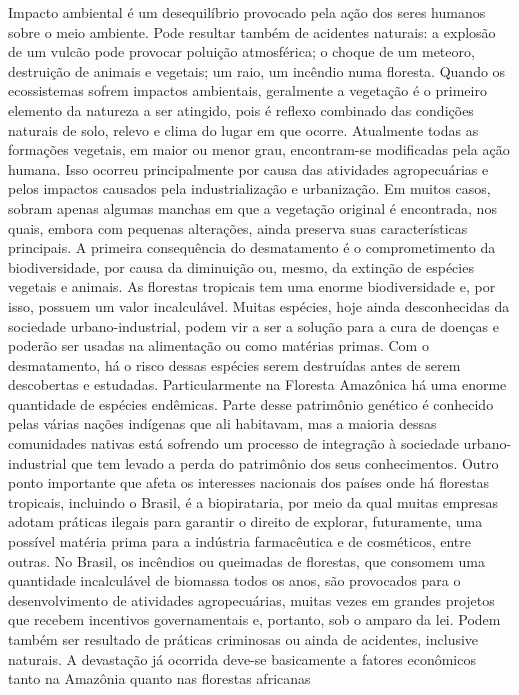Impacto ambiental é um desequilíbrio provocado pela ação dos seres humanos sobre o meio ambiente.
Pode resultar também de acidentes naturais: a explosão de um vulcão pode provocar poluição atmosférica; 
o choque de um meteoro, destruição de animais e vegetais; um raio, um incêndio numa floresta.
    Quando os ecossistemas sofrem impactos ambientais, geralmente a vegetação é o primeiro elemento da
natureza a ser atingido, pois é reflexo combinado das condições naturais de solo, relevo e clima do lugar 
em que ocorre.
    Atualmente todas as formações vegetais, em maior ou menor grau, encontram-se modificadas pela ação humana.
Isso ocorreu principalmente por causa das atividades agropecuárias e pelos impactos causados pela industrialização
e urbanização. Em muitos casos, sobram apenas algumas manchas em que a vegetação original é encontrada, nos quais,
embora com pequenas alterações, ainda preserva suas características principais.
    A primeira consequência do desmatamento é o comprometimento da biodiversidade, por causa da diminuição ou, mesmo,
da extinção de espécies vegetais e animais. As florestas tropicais tem uma enorme biodiversidade e, por isso, possuem
um valor incalculável. Muitas espécies, hoje ainda desconhecidas da sociedade urbano-industrial, podem vir a ser a solução
para a cura de doenças e poderão ser usadas na alimentação ou como matérias primas. Com o desmatamento, há o risco dessas
espécies serem destruídas antes de serem descobertas e estudadas.
    Particularmente na Floresta Amazônica há uma enorme quantidade de espécies endêmicas. Parte desse patrimônio genético
é conhecido pelas várias nações indígenas que ali habitavam, mas a maioria dessas comunidades nativas está sofrendo um
processo de integração à sociedade urbano-industrial que tem levado a perda do patrimônio dos seus conhecimentos. Outro
ponto importante que afeta os interesses nacionais dos países onde há florestas tropicais, incluindo o Brasil, é a 
biopirataria, por meio da qual muitas empresas adotam práticas ilegais para garantir o direito de explorar, futuramente,
uma possível matéria prima para a indústria farmacêutica e de cosméticos, entre outras.
    No Brasil, os incêndios ou queimadas de florestas, que consomem uma quantidade incalculável de biomassa todos os
anos, são provocados para o desenvolvimento de atividades agropecuárias, muitas vezes em grandes projetos que recebem
incentivos governamentais e, portanto, sob o amparo da lei. Podem também ser resultado de práticas criminosas ou ainda
de acidentes, inclusive naturais.
    A devastação já ocorrida deve-se basicamente a fatores econômicos tanto na Amazônia quanto nas florestas africanas
